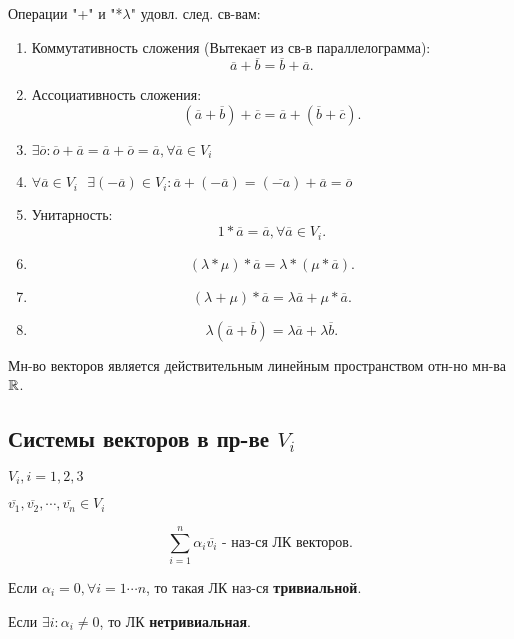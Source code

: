 \begin{theorem}
Операции "+" и "*$\lambda$" удовл. след. св-вам:
\begin{enumerate}
    \item Коммутативность сложения (Вытекает из св-в параллелограмма):
        \[
        \overline{a} + \overline{b} = \overline{b} + \overline{a}
        .\] 
    \item Ассоциативность сложения:
        \[
            (\overline{a} + \overline{b}) + \overline{c} = \overline{a} + (\overline{b} + \overline{c})
        .\] 
    \item $\exists  \overline{o} \colon  \overline{o} + \overline{a} = \overline{a} + \overline{o} = \overline{a}, \forall \overline{a}  \in V_i$
    \item $\forall \overline{a}  \in V_i \text{ }\exists (-\overline{a})  \in V_i \colon \overline{a} + (-\overline{a}) = (\overline{-a}) + \overline{a} = \overline{o}$
    \item Унитарность:
        \[
        1 * \overline{a} = \overline{a}, \forall \overline{a}  \in V_i
        .\] 
    \item \[
            (\lambda * \mu) * \overline{a} = \lambda * (\mu * \overline{a})
    .\] 
\item \[
        (\lambda + \mu) * \overline{a} = \lambda \overline{a} + \mu * \overline{a}
.\] 
\item \[
\lambda(\overline{a} + \overline{b}) = \lambda \overline{a} + \lambda \overline{b}
.\]  
\end{enumerate}
\end{theorem}
\begin{note}
Мн-во векторов является действительным линейным пространством отн-но мн-ва $\mathbb{R}$.
\end{note}

\subsection{Системы векторов в пр-ве $V_i$}
$ V_i, i = 1, 2, 3$ 

$\overline{v_1}, \overline{v_2}, \cdots, \overline{v_n}  \in V_i$ 

\begin{symb}
    \[
    \sum_{i = 1}^{n}  \alpha_i \overline{v_i} \text{ - наз-ся ЛК векторов}
    .\] 

    Если $\alpha_i = 0, \forall i=1\cdots n$, то такая ЛК наз-ся \textbf{тривиальной}.

    Если $\exists i \colon  \alpha_i \neq 0$, то ЛК \textbf{нетривиальная}.
\end{symb}

